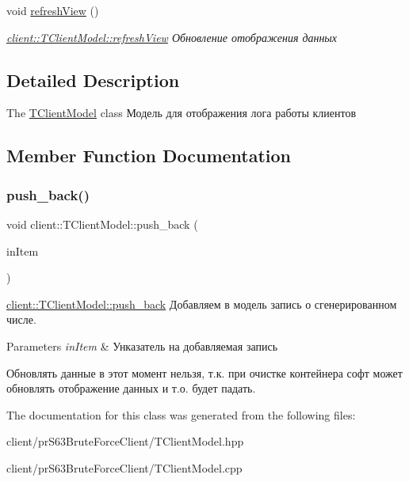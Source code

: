 \begin{DoxyCompactItemize}
\mbox{\label{classclient_1_1_t_client_model_aea0cb37f9e91c028f699e4da3663fcea}} 
void \hyperlink{classclient_1_1_t_client_model_aea0cb37f9e91c028f699e4da3663fcea}{refresh\+View} ()
\begin{DoxyCompactList}\small\item\em \hyperlink{classclient_1_1_t_client_model_aea0cb37f9e91c028f699e4da3663fcea}{client\+::\+T\+Client\+Model\+::refresh\+View} Обновление отображения данных \end{DoxyCompactList}\end{DoxyCompactItemize}


\subsection{Detailed Description}
The \hyperlink{classclient_1_1_t_client_model}{T\+Client\+Model} class Модель для отображения лога работы клиентов 

\subsection{Member Function Documentation}
\mbox{\label{classclient_1_1_t_client_model_aed00383c6177d60cb6f4b34b23fce485}} 
\subsubsection{\texorpdfstring{push\+\_\+back()}{push\_back()}}
{\footnotesize\ttfamily void client\+::\+T\+Client\+Model\+::push\+\_\+back (\begin{DoxyParamCaption}\item[{common\+Define\+Client\+::td\+Log\+Item\+Client}]{in\+Item }\end{DoxyParamCaption})}



\hyperlink{classclient_1_1_t_client_model_aed00383c6177d60cb6f4b34b23fce485}{client\+::\+T\+Client\+Model\+::push\+\_\+back} Добавляем в модель запись о сгенерированном числе. 


\begin{DoxyParams}{Parameters}
{\em in\+Item} & Унказатель на добавляемая запись\\
\hline
\end{DoxyParams}
Обновлять данные в этот момент нельзя, т.\+к. при очистке контейнера софт может обновлять отображение данных и т.\+о. будет падать. 

The documentation for this class was generated from the following files\+:\begin{DoxyCompactItemize}
\item 
client/pr\+S63\+Brute\+Force\+Client/T\+Client\+Model.\+hpp\item 
client/pr\+S63\+Brute\+Force\+Client/T\+Client\+Model.\+cpp\end{DoxyCompactItemize}
